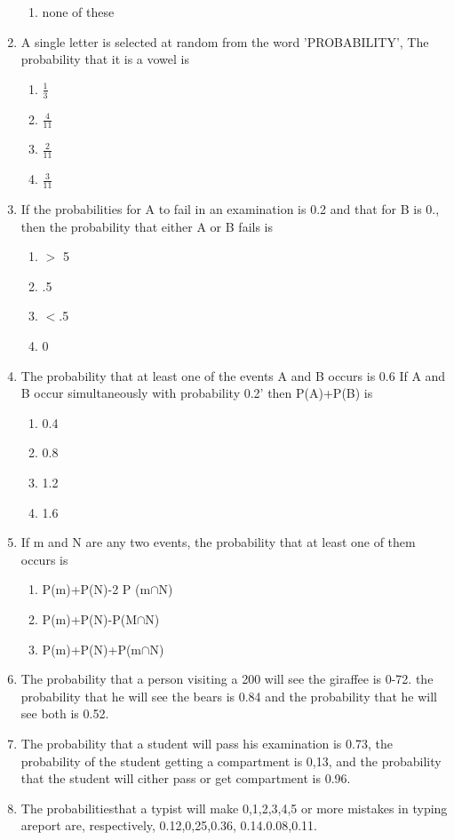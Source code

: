 \documentclass[12pt]{article}
\begin{document}
\begin{enumerate}
\begin{enumerate}
\item none of these
\end{enumerate}
\item A single letter is selected at random from the word 'PROBABILITY', The probability that it is a vowel is
\begin{enumerate}
\item $\frac{1}{3}$
\item $\frac{4}{11}$
\item $\frac{2}{11}$
\item $\frac{3}{11}$
\end{enumerate}
\item If the probabilities for A to fail in an examination is 0.2 and that for B is 0., then the probability that either A or B fails is
\begin{enumerate}
\item $>$ 5 
\item .5
\item $<$.5
\item 0
\end{enumerate}
\item The probability that at least one of the events A and B occurs is 0.6 If A and B occur simultaneously with probability 0.2' then P(A)+P(B) is 
\begin{enumerate}
\item 0.4
\item 0.8
\item 1.2
\item 1.6
\end{enumerate}
\item If m and N are any two events, the probability that at least one of them occurs is
\begin{enumerate}
\item P(m)+P(N)-2 P (m$\cap$N)
\item P(m)+P(N)-P(M$\cap$N)
\item P(m)+P(N)+P(m$\cap$N)
\end{enumerate}
\item The probability that a person visiting a 200 will see the giraffee is 0-72. the probability that he will see the bears is 0.84 and the probability that he will see both is 0.52.
\item The probability that a student will pass his examination is 0.73, the probability of the student getting a compartment is 0,13, and the probability that the student will cither pass or get compartment is 0.96.
\item The probabilitiesthat a typist will make 0,1,2,3,4,5 or more mistakes in typing areport are, respectively, 0.12,0,25,0.36, 0.14.0.08,0.11.

\end{enumerate}
\end{document}
